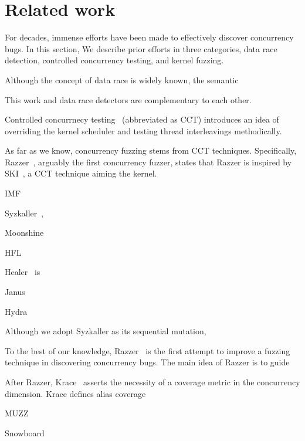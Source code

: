 \section{Related work}
\label{s:relwk}

For decades, immense efforts have been made to effectively discover
concurrency bugs. In this section, We describe prior efforts in three
categories, data race detection, controlled concurrency testing, and
kernel fuzzing.


%

\cite{lkmm, linuxmemorymodel}

Although the concept of data race is widely known, the semantic

This work and data race detectors are complementary to each other.
%



%
Controlled concurrnecy testing~\cite{ski, pctalgorithm, sparsernr,
  chess, nagarakatte2012multicore, abdelrasoul2017promoting,
  cai2016radius, mukherjee2020learning, schedulebounding} (abbreviated
as CCT) introduces an idea of overriding the kernel scheduler and
testing thread interleavings methodically.
%



As far as we know, concurrency fuzzing stems from CCT techniques.
%
Specifically, Razzer~\cite{razzer}, arguably the first concurrency
fuzzer, states that Razzer is inspired by SKI~\cite{ski}, a CCT
technique aiming the kernel.




%
%

IMF~\cite{imf}

Syzkaller~\cite{syzkaller},

Moonshine~\cite{moonshine}

HFL~\cite{hfl}

Healer~\cite{healer} is

Janus~\cite{janus}

Hydra~\cite{hydra}


Although we adopt Syzkaller as its sequential mutation, 




% 
To the best of our knowledge, Razzer~\cite{razzer} is the first
attempt to improve a fuzzing technique in discovering concurrency
bugs.
%
The main idea of Razzer is to guide


After Razzer, Krace~\cite{krace} asserts the necessity of a coverage
metric in the concurrency dimension. Krace defines alias coverage


MUZZ~\cite{muzz}


Snowboard~\cite{snowboard}



